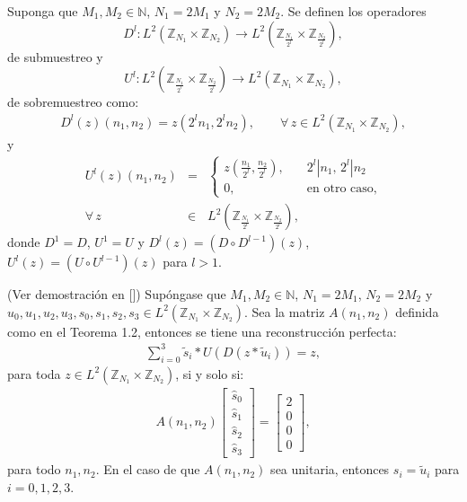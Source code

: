 \begin{definition}
Suponga que $M_1,M_2\in\mathbb{N}$, $N_1=2M_1$ y $N_2=2M_2$. Se definen los operadores $$D^l: L^2(\mathbb{Z}_{N_1}\times\mathbb{Z}_{N_2})\rightarrow L^2\left(\mathbb{Z}_{\frac{N_1}{2^l}}\times\mathbb{Z}_{\frac{N_2}{2^l}}\right),$$ de submuestreo y $$U^l: L^2\left(\mathbb{Z}_{\frac{N_1}{2^l}}\times\mathbb{Z}_{\frac{N_2}{2^l}}\right)\rightarrow L^2(\mathbb{Z}_{N_1}\times\mathbb{Z}_{N_2}),$$ de sobremuestreo como:
\begin{eqnarray}
D^l(z)(n_1,n_2)=z(2^ln_1,2^ln_2),\qquad\forall\,z\in L^2(\mathbb{Z}_{N_1}\times\mathbb{Z}_{N_2}),\nonumber
\end{eqnarray}
y
\begin{eqnarray}
U^l(z)(n_1,n_2)&=&\left\{\begin{array}{rr}
z\left(\frac{n_1}{2^l},\frac{n_2}{2^l}\right),&\quad 2^l | n_1,\, 2^l|n_2\\
0,&\quad\mbox{en otro caso,}
\end{array}\right.\nonumber\\
\forall\,z&\in &L^2\left(\mathbb{Z}_{\frac{N_1}{2^l}}\times\mathbb{Z}_{\frac{N_2}{2^l}}\right),\nonumber
\end{eqnarray}
donde $D^1=D$, $U^1=U$ y $D^l(z)=(D\circ D^{l-1})(z)$, $U^l(z)=(U\circ U^{l-1})(z)$ para $l>1$.
\end{definition}

\begin{theorem}
(Ver demostraci\'on en [\textcolor{cyan}{\cite{12}}]) Sup\'ongase que $M_1,M_2\in\mathbb{N}$, $N_1=2M_1$, $N_2=2M_2$ y $u_0,u_1,u_2,u_3,s_0,s_1,s_2,s_3\in L^2(\mathbb{Z}_{N_1}\times\mathbb{Z}_{N_2})$. Sea la matriz $A(n_1,n_2)$ definida como en el Teorema 1.2, entonces se tiene una reconstrucci\'on perfecta:
\begin{eqnarray}
\sum_{i=0}^3 \tilde{s}_i\ast U(D(z\ast\tilde{u}_i))=z,\nonumber
\end{eqnarray}
para toda $z\in L^2(\mathbb{Z}_{N_1}\times\mathbb{Z}_{N_2})$, si y solo si:
\begin{eqnarray}
A(n_1,n_2)\left[\begin{array}{c}
\hat{s}_0\\ \hat{s}_1\\ \hat{s}_2\\ \hat{s}_3
\end{array}\right]=\left[\begin{array}{c}
2\\0\\0\\0
\end{array}\right],\nonumber
\end{eqnarray}
para todo $n_1,n_2$. En el caso de que $A(n_1,n_2)$ sea unitaria, entonces $s_i=\tilde{u}_i$ para $i=0,1,2,3$.
\label{reconstruccion-perfecta}
\end{theorem}

